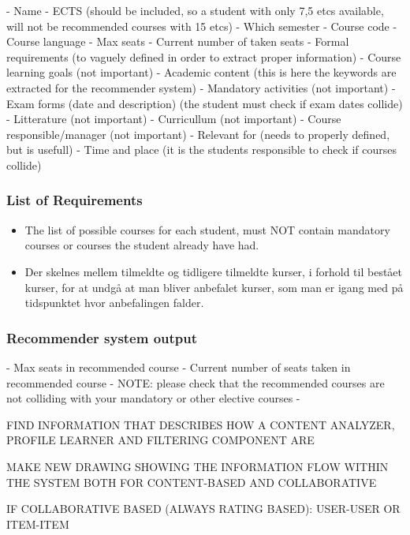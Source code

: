 - Name
- ECTS (should be included, so a student with only 7,5 etcs available, will not be recommended courses with 15 etcs)
- Which semester
- Course code
- Course language
- Max seats
- Current number of taken seats
- Formal requirements (to vaguely defined in order to extract proper information)
- Course learning goals (not important)
- Academic content (this is here the keywords are extracted for the recommender system)
- Mandatory activities (not important)
- Exam forms (date and description) (the student must check if exam dates collide)
- Litterature (not important)
- Curricullum (not important)
- Course responsible/manager (not important)
- Relevant for (needs to properly defined, but is usefull)
- Time and place (it is the students responsible to check if courses collide)



\subsubsection{List of Requirements}
\begin{itemize}
	\item The list of possible courses for each student, must NOT contain mandatory courses or courses the student already have had.
	\item Der skelnes mellem tilmeldte og tidligere tilmeldte kurser, i forhold til bestået kurser, for at undgå at man bliver anbefalet kurser, som man er igang med på tidspunktet hvor anbefalingen falder. 
\end{itemize}
  

\subsubsection{Recommender system output}

- Max seats in recommended course
- Current number of seats taken in recommended course
- NOTE: please check that the recommended courses are not colliding with your mandatory or other elective courses
- 




FIND INFORMATION THAT DESCRIBES HOW A CONTENT ANALYZER, PROFILE LEARNER AND FILTERING COMPONENT ARE 

MAKE NEW DRAWING SHOWING THE INFORMATION FLOW WITHIN THE SYSTEM BOTH FOR CONTENT-BASED AND COLLABORATIVE



IF COLLABORATIVE BASED (ALWAYS RATING BASED): USER-USER OR ITEM-ITEM

